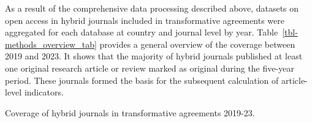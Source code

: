 \documentclass[a4paper,man,floatsintext,longtable,noextraspace,10pt]{apa6}
\begin{document}
As a result of the comprehensive data processing described above,
datasets on open access in hybrid journals included in transformative
agreements were aggregated for each database at country and journal
level by year. Table~\ref{tbl-methods_overview_tab} provides a general
overview of the coverage between 2019 and 2023. It shows that the
majority of hybrid journals published at least one original research
article or review marked as original during the five-year period. These
journals formed the basis for the subsequent calculation of
article-level indicators.

\begin{table}

\caption{\label{tbl-methods_overview_tab}Coverage of hybrid journals in
transformative agreements 2019-23.}

\centering{

}
\end{table}
\end{document}
